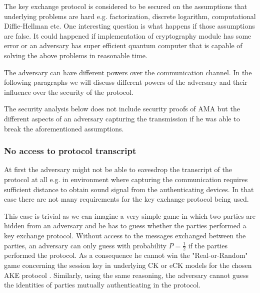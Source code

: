 \documentclass[11pt,titlepage]{article}
\theoremstyle{plain}
\begin{document}
\vspace{5mm}

The key exchange protocol is considered to be secured on the assumptions that underlying problems are hard e.g. factorization, discrete logarithm, computational Diffie-Hellman etc. One interesting question is what happens if those assumptions are false. It could happened if implementation of cryptography module has some error or an adversary has super efficient quantum computer that is capable of solving the above problems in reasonable time.

\vspace{5mm}

The adversary can have different powers over the communication channel. In the following paragraphs we will discuss different powers of the adversary and their influence over the security of the protocol.

\vspace{5mm}

The security analysis below does not include security proofs of AMA but the different aspects of an adversary capturing the transmission if he was able to break the aforementioned assumptions.

\subsubsection{No access to protocol transcript}
At first the adversary might not be able to eavesdrop the transcript of the protocol at all e.g. in environment where capturing the communication requires sufficient distance to obtain sound signal from the authenticating devices. In that case there are not many requirements for the key exchange protocol being used.

\vspace{5mm}

This case is trivial as we can imagine a very simple game in which two parties are hidden from an adversary and he has to guess whether the parties performed a key exchange protocol. Without access to the messages exchanged between the parties, an adversary can only guess with probability $P = \frac{1}{2}$ if the parties performed the protocol. As a consequence he cannot win the "Real-or-Random" game concerning the session key in underlying CK or eCK models for the chosen AKE protocol \cite{key_exchange, efficient_eck, security_canetti_krawczyk}. Similarly, using the same reasoning, the adversary cannot guess the identities of parties mutually authenticating in the protocol. 
\end{document}
